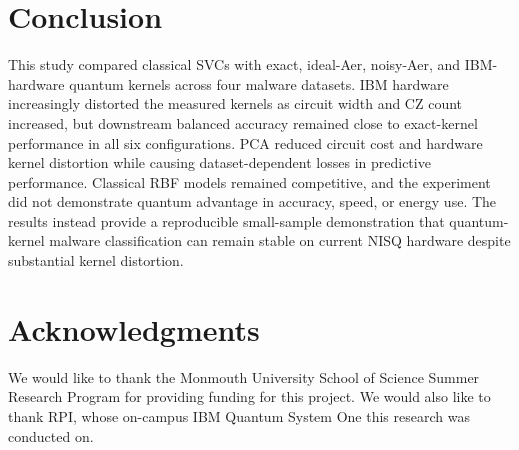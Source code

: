 \documentclass[letterpaper]{article} %
\begin{document}
\section{Conclusion}

This study compared classical SVCs with exact, ideal-Aer, noisy-Aer, and IBM-hardware quantum kernels across four malware datasets. IBM hardware increasingly distorted the measured kernels as circuit width and CZ count increased, but downstream balanced accuracy remained close to exact-kernel performance in all six configurations. PCA reduced circuit cost and hardware kernel distortion while causing dataset-dependent losses in predictive performance. Classical RBF models remained competitive, and the experiment did not demonstrate quantum advantage in accuracy, speed, or energy use. The results instead provide a reproducible small-sample demonstration that quantum-kernel malware classification can remain stable on current NISQ hardware despite substantial kernel distortion.



\section{Acknowledgments}
We would like to thank the Monmouth University School of Science Summer Research Program for providing funding for this project. We would also like to thank RPI, whose on-campus IBM Quantum System One this research was conducted on.


\end{document}
